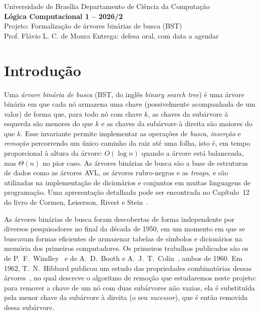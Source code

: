 \documentclass[11pt,a4paper]{article}
\newcommand{\prazo}{defesa oral, com data a agendar}
\begin{document}
\thispagestyle{empty}
\begin{tcolorbox}[enhanced,colback=unbblue,colframe=unbblue,arc=0mm,
  left=12pt,right=12pt,top=10pt,bottom=10pt,coltext=white]
  {\small Universidade de Brasília \hfill Departamento de Ciência da Computação}\\[0.6em]
  {\LARGE\bfseries Lógica Computacional 1 -- 2026/2}\\[0.4em]
  {\Large Projeto: Formalização de árvores binárias de busca (BST)}\\[0.6em]
  {\small Prof. Flávio L. C. de Moura \hfill Entrega: \prazo}
\end{tcolorbox}


\section{Introdução}

Uma \emph{árvore binária de busca} (BST, do inglês \emph{binary search tree}) é uma árvore binária em que cada nó
armazena uma chave (possivelmente acompanhada de um valor) de forma que,
para todo nó com chave $k$, as chaves da subárvore à esquerda são menores
do que $k$ e as chaves da subárvore à direita são maiores do que $k$. Esse
invariante permite implementar as operações de \emph{busca},
\emph{inserção} e \emph{remoção} percorrendo um único caminho da raiz até
uma folha, isto é, em tempo proporcional à altura da árvore: $O(\log n)$
quando a árvore está balanceada, mas $\Theta(n)$ no pior caso. As árvores
binárias de busca são a base de estruturas de dados como as árvores AVL,
as árvores rubro-negras e as \emph{treaps}, e são utilizadas na
implementação de dicionários e conjuntos em muitas linguagens de
programação. Uma apresentação detalhada pode ser encontrada no Capítulo~12
do livro de Cormen, Leiserson, Rivest e Stein~\cite{cormen2022}.

As árvores binárias de busca foram descobertas de forma independente por
diversos pesquisadores no final da década de 1950, em um momento em que se
buscavam formas eficientes de armazenar tabelas de símbolos e dicionários
na memória dos primeiros computadores. Os primeiros trabalhos publicados
são os de P.~F.~Windley~\cite{windley1960} e de A.~D.~Booth e
A.~J.~T.~Colin~\cite{booth1960}, ambos de 1960. Em 1962, T.~N.~Hibbard
publicou um estudo das propriedades combinatórias dessas
árvores~\cite{hibbard1962}, no qual descreve o algoritmo de remoção que
estudaremos neste projeto: para remover a chave de um nó com duas
subárvores não vazias, ela é substituída pela menor chave da subárvore à
direita (o seu \emph{sucessor}), que é então removida dessa subárvore.
\end{document}
